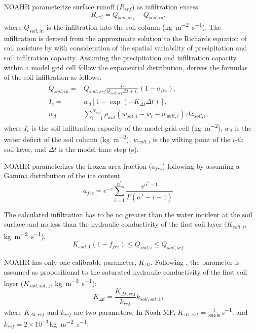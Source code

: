 \documentclass[essd]{copernicus}
\begin{document}
NOAHR parameterize surface runoff (\(R_{srf}\)) as infiltration excess:
\begin{equation}
  R_{srf} = Q_{soil,srf} - Q_{soil,in} \text{,}
\end{equation}
where \(Q_{soil,in}\) is the infiltration into the soil column
(\si{kg~m^{-2}~s^{-1}}). The infiltration is derived from the approximate
solution to the Richards equation of soil moisture by \citet{philip1969AiH} with
consideration of the spatial variability of precipitation and soil infiltration
capacity. Assuming the precipitation and infiltration capacity within a model
grid cell follow the exponential distribution, \citet{schaake1996JGRA} derives
the formulas of the soil infiltration as follows:
\begin{align}
  Q_{soil,in} = & Q_{soil,srf} \frac{I_c}{Q_{soil,srf} \Delta t + I_c} (1-a_{frz}) \text{,} \\
  I_{c} =       & w_d [1-\exp(-K_{\Delta t} \Delta t)] \text{,} \\
  w_d =         & \sum_{i=1}^{N_{soil}} \rho_{wat} (w_{sat,i} - w_i - w_{wilt,i}) \Delta z_{soil,i}
  \text{,}
\end{align}
where \(I_{c}\) is the soil infiltration capacity of the model grid cell
(\si{kg~m^{-2}}), \(w_d\) is the water deficit of the soil column
(\si{kg~m^{-2}}), \(w_{wilt,i}\) is the wilting point of the \(i\)-th soil
layer, and \(\Delta t\) is the model time step (\si{s}).

NOAHR parameterizes the frozen area fraction (\(a_{frz}\)) following
\citet{koren1999JGRA} by assuming a Gamma distribution of the ice content.
\begin{equation}
  a_{frz} = e^{-v} \sum_{i=1}^{\alpha^*} \frac{v^{\alpha^*-1}}{\Gamma(\alpha^*-i+1)}
\end{equation}

The calculated infiltration has to be no greater than the water
incident at the soil surface and no less than the hydraulic conductivity of the
first soil layer (\(K_{soil,i}\), \si{kg~m^{-2}~s^{-1}}).
\begin{equation}
  K_{soil,1} (1-f_{frz}) \leq Q_{soil,i} \leq Q_{soil,srf}
\end{equation}

NOAHR has only one calibrable parameter, \(K_{\Delta t}\). Following
\citet{chen2001MWR}, the parameter is assumed as propositional to the saturated
hydraulic conductivity of the first soil layer (\(K_{soil,sat,1}\),
\si{kg~m^{-2}~s^{-1}}):
\begin{equation}
  K_{\Delta t} = \frac{{K}_{\Delta t, ref}}{k_{ref}} k_{soil,sat,1} \text{,}
\end{equation}
where \(K_{\Delta t,ref}\) and \(k_{ref}\) are two parameters. In Noah-MP,
\(K_{\Delta t,ref} = \frac{3}{86400}\)\,\si{s^{-1}}, and \(k_{ref}=2 \times
10^{-3}\)\,\si{kg~m^{-2}~s^{-1}}.
\end{document}
